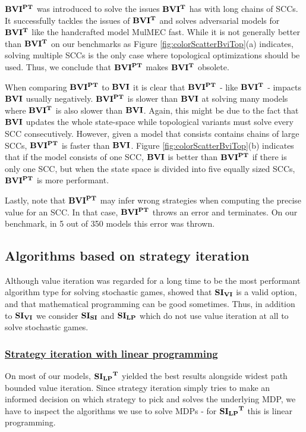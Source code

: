 $\mathbf{BVI^{PT}}$ was introduced to solve the issues $\mathbf{BVI^T}$ has with long chains of SCCs.
It successfully tackles the issues of $\mathbf{BVI^T}$ and solves adversarial models for $\mathbf{BVI^T}$ like the handcrafted model MulMEC fast.
While it is not generally better than $\mathbf{BVI^T}$ on our benchmarks as Figure \ref{fig:colorScatterBviTop}(a) indicates, 
solving multiple SCCs is the only case where topological optimizations should be used. 
Thus, we conclude that $\mathbf{BVI^{PT}}$ makes $\mathbf{BVI^T}$ obsolete.

When comparing $\mathbf{BVI^{PT}}$ to $\mathbf{BVI}$ it is clear that $\mathbf{BVI^{PT}}$ - like $\mathbf{BVI^T}$ - impacts $\mathbf{BVI}$ usually negatively. 
$\mathbf{BVI^{PT}}$ is slower than $\mathbf{BVI}$ at solving many models where $\mathbf{BVI^T}$ is also slower than $\mathbf{BVI}$.
Again, this might be due to the fact that $\mathbf{BVI}$ updates the whole state-space while topological variants must solve every SCC consecutively.
However, given a model that consists contains chains of large SCCs, $\mathbf{BVI^{PT}}$ is faster than $\mathbf{BVI}$.
Figure \ref{fig:colorScatterBviTop}(b) indicates that if the model consists of one SCC, $\mathbf{BVI}$ is better than $\mathbf{BVI^{PT}}$ if there is only one SCC, 
but when the state space is divided into five equally sized SCCs, $\mathbf{BVI^{PT}}$ is more performant.

Lastly, note that $\mathbf{BVI^{PT}}$ may infer wrong strategies when computing the precise value for an SCC. 
In that case, $\mathbf{BVI^{PT}}$ throws an error and terminates. On our benchmark, in 5 out of 350 models this error was thrown.

\subsection{Algorithms based on strategy iteration}
Although value iteration was regarded for a long time to be the most performant algorithm type for solving stochastic games, 
\cite{gandalf} showed that $\mathbf{SI_{VI}}$ is a valid option, and that mathematical programming can be good sometimes.
Thus, in addition to $\mathbf{SI_{VI}}$ we consider $\mathbf{SI_{SI}}$ and $\mathbf{SI_{LP}}$ which do not use value iteration at all to solve stochastic games.

\subsubsection*{\underline{Strategy iteration with linear programming}}
On most of our models, $\mathbf{\mathbf{SI_{LP}}^T}$ yielded the best results alongside widest path bounded value iteration.
Since strategy iteration simply tries to make an informed decision on which strategy to pick and solves the underlying MDP, 
we have to inspect the algorithms we use to solve MDPs - for $\mathbf{\mathbf{SI_{LP}}^T}$ this is linear programming.


